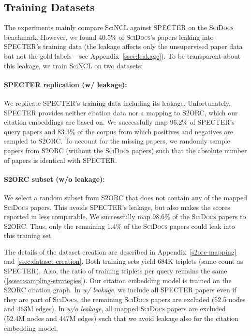 \documentclass[11pt]{article}
\newcommand{\dataset}{\textsc{SciDocs}\xspace}
\newcommand{\sys}{SciNCL\xspace} \newcommand{\baselineCount}{10\xspace}
\begin{document}
\subsection{Training Datasets} \label{ssec:training-data}

The experiments mainly compare \sys against SPECTER on the \dataset benchmark. 
However, we found 40.5\% of \dataset's papers leaking into SPECTER's training data (the leakage affects only the unsupervised paper data but not the gold labels -- see Appendix~\ref{ssec:leakage}).
To be transparent about this leakage, we train \sys on two datasets:


\paragraph{SPECTER replication (w/ leakage):}
We replicate SPECTER's training data including its leakage.
Unfortunately, SPECTER provides neither citation data nor a mapping to S2ORC, which our citation embeddings are based on.
We successfully map 96.2\% of SPECTER's query papers and 83.3\% of the corpus from which positives and negatives are sampled to S2ORC.
To account for the missing papers, we randomly sample papers from S2ORC (without the \dataset papers) such that the absolute number of papers is identical with SPECTER.

\paragraph{S2ORC subset (w/o leakage):}
We select a random subset from S2ORC that does not contain any of the mapped \dataset papers.
This avoids SPECTER's leakage, but also makes the scores reported in \citet{Cohan2020} less comparable.
We successfully map 98.6\% of the \dataset papers to S2ORC. 
Thus, only the remaining 1.4\% of the \dataset papers could leak into this training set.

The details of the dataset creation are described in Appendix~\ref{s2orc-mapping} and \ref{ssec:dataset-creation}.
Both training sets yield 684K triplets (same count as SPECTER).
Also, the ratio of training triplets per query remains the same (\cref{sssec:sampling-strategies}).
Our citation embedding model is trained on the S2ORC citation graph.
In \textit{w/ leakage}, we include all SPECTER papers even if they are part of \dataset, the remaining \dataset papers are excluded (52.5 nodes and 463M edges).
In \textit{w/o leakage}, all mapped \dataset papers are excluded (52.4M nodes and 447M edges) such that we avoid leakage also for the citation embedding model.
\end{document}
